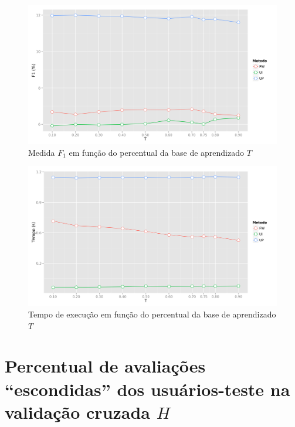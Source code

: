 \begin{figure}[htp]
    \begin{center}
    \includegraphics[width=1\textwidth]{img/F1_T}
    \end{center}
    \caption{Medida $F_1$ em função do percentual da base de aprendizado $T$}
    \label{fig:F1_T}
\end{figure}

\begin{figure}[htp]
    \begin{center}
    \includegraphics[width=1\textwidth]{img/time_T}
    \end{center}
    \caption{Tempo de execução em função do percentual da base de aprendizado $T$}
    \label{fig:time_T}
\end{figure}


\section{Percentual de avaliações ``escondidas'' dos usuários-teste na validação cruzada $H$} %
\label{sec:percentual_de_avalia_es_dos_usu_rios_teste_na_valida_o_cruzada}

